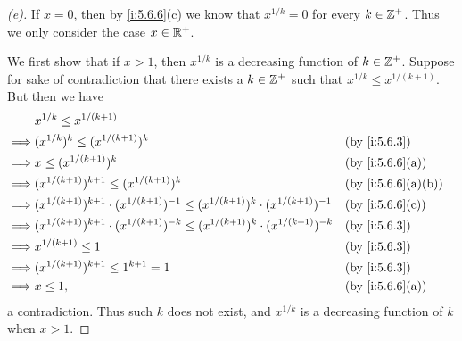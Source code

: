 \begin{proof}[(e)]
  If \(x = 0\), then by \cref{i:5.6.6}(c) we know that \(x^{1 / k} = 0\) for every \(k \in \mathbb{Z}^+\).
  Thus we only consider the case \(x \in \mathbb{R}^+\).

  We first show that if \(x > 1\), then \(x^{1 / k}\) is a decreasing function of \(k \in \mathbb{Z}^+\).
  Suppose for sake of contradiction that there exists a \(k \in \mathbb{Z}^+\) such that \(x^{1 / k} \leq x^{1 / (k + 1)}\).
  But then we have
  \begin{align*}
             & x^{1 / k} \leq x^{1 / (k + 1)}                                                                                                      \\
    \implies & (x^{1 / k})^k \leq (x^{1 / (k + 1)})^k                                                                       &  & \by{i:5.6.3}      \\
    \implies & x \leq (x^{1 / (k + 1)})^k                                                                                   &  & \by{i:5.6.6}[a]   \\
    \implies & (x^{1 / (k + 1)})^{k + 1} \leq (x^{1 / (k + 1)})^k                                                           &  & \by{i:5.6.6}[a,b] \\
    \implies & (x^{1 / (k + 1)})^{k + 1} \cdot (x^{1 / (k + 1)})^{-1} \leq (x^{1 / (k + 1)})^k \cdot (x^{1 / (k + 1)})^{-1} &  & \by{i:5.6.6}[c]   \\
    \implies & (x^{1 / (k + 1)})^{k + 1} \cdot (x^{1 / (k + 1)})^{-k} \leq (x^{1 / (k + 1)})^k \cdot (x^{1 / (k + 1)})^{-k} &  & \by{i:5.6.3}      \\
    \implies & x^{1 / (k + 1)} \leq 1                                                                                       &  & \by{i:5.6.3}      \\
    \implies & (x^{1 / (k + 1)})^{k + 1} \leq 1^{k + 1} = 1                                                                 &  & \by{i:5.6.3}      \\
    \implies & x \leq 1,                                                                                                    &  & \by{i:5.6.6}[a]
  \end{align*}
  a contradiction.
  Thus such \(k\) does not exist, and \(x^{1 / k}\) is a decreasing function of \(k\) when \(x > 1\).


\end{proof}
